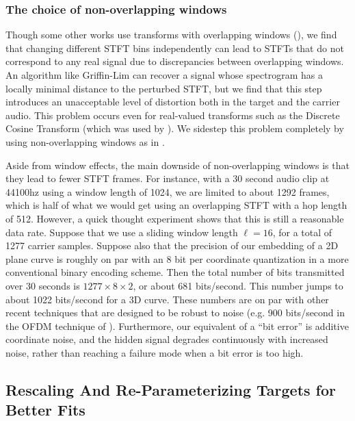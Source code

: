 \documentclass[runningheads]{llncs}
\begin{document}
\subsubsection{The choice of non-overlapping windows}
Though some other works use transforms with overlapping windows (\cite{hwan_sik_yun_acoustic_2010,geleta_pixinwav_2021}), we find that changing different STFT bins independently can lead to STFTs that do not correspond to any real signal due to discrepancies between overlapping windows.  An algorithm like Griffin-Lim \cite{griffin1984signal} can recover a signal whose spectrogram has a locally minimal distance to the perturbed STFT, but we find that this step introduces an unacceptable level of distortion both in the target and the carrier audio.  This problem occurs even for real-valued transforms such as the Discrete Cosine Transform (which was used by \cite{geleta_pixinwav_2021}).  We sidestep this problem completely by using non-overlapping windows as in \cite{xiaoxiao_dong_data_2004}.  

Aside from window effects, the main downside of non-overlapping windows is that they lead to fewer STFT frames.  For instance, with a 30 second audio clip at 44100hz using a window length of 1024, we are limited to about 1292 frames, which is half of what we would get using an overlapping STFT with a hop length of 512.  However, a quick thought experiment shows that this is still a reasonable data rate.  Suppose that we use a sliding window length $\ell=16$, for a total of 1277 carrier samples.  Suppose also that the precision of our embedding of a 2D plane curve is roughly on par with an 8 bit per coordinate quantization in a more conventional binary encoding scheme.  Then the total number of bits transmitted over 30 seconds is $1277 \times 8 \times 2$, or about 681 bits/second.  This number jumps to about 1022 bits/second for a 3D curve.  These numbers are on par with other recent techniques that are designed to be robust to noise (e.g. 900 bits/second in the OFDM technique of \cite{eichelberger_receiving_2019}).  Furthermore, our equivalent of a ``bit error'' is additive coordinate noise, and the hidden signal degrades continuously with increased noise, rather than reaching a failure mode when a bit error is too high.




\subsection{Rescaling And Re-Parameterizing Targets for Better Fits}
\label{sec:reparam}
\end{document}
